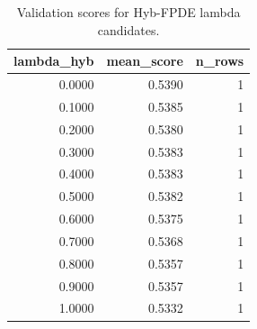 \begin{table}[t]
\caption{Validation scores for Hyb-FPDE lambda candidates.}
\label{tab:lambda_distribution_computed}
\centering
\begin{tabular}{rrr}
\toprule
lambda\_hyb & mean\_score & n\_rows \\
\midrule
0.0000 & 0.5390 & 1 \\
0.1000 & 0.5385 & 1 \\
0.2000 & 0.5380 & 1 \\
0.3000 & 0.5383 & 1 \\
0.4000 & 0.5383 & 1 \\
0.5000 & 0.5382 & 1 \\
0.6000 & 0.5375 & 1 \\
0.7000 & 0.5368 & 1 \\
0.8000 & 0.5357 & 1 \\
0.9000 & 0.5357 & 1 \\
1.0000 & 0.5332 & 1 \\
\bottomrule
\end{tabular}

\end{table}
